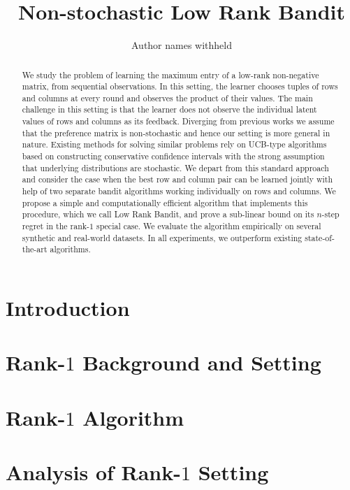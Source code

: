 \documentclass{article}
\title{Non-stochastic Low Rank Bandit}
\author{Author names withheld}
\begin{document}
\maketitle
\begin{abstract}
We study the problem of learning the maximum entry of a low-rank non-negative matrix, from sequential observations. In this setting, the learner chooses tuples of rows and columns at every round and observes the product of their values. The main challenge in this setting is that the learner does not observe the individual latent values of rows and columns as its feedback. Diverging from previous works we assume that the preference matrix is non-stochastic and hence our setting is more general in nature. Existing methods for solving similar problems rely on UCB-type algorithms based on constructing conservative confidence intervals with the strong assumption that underlying distributions are stochastic. We depart from this standard approach and consider the case when the best row and column pair can be learned jointly with help of two separate bandit algorithms working individually on rows and columns. We propose a simple and computationally efficient algorithm that implements this procedure, which we call Low Rank Bandit, and prove a sub-linear bound on its $n$-step regret in the rank-$1$ special case. We evaluate the algorithm empirically on several synthetic and real-world datasets. In all experiments, we outperform existing state-of-the-art algorithms.
\end{abstract}

\section{Introduction}
\label{sec:introduction}


\section{Rank-$1$ Background and Setting}
\label{sec:background}


\section{Rank-$1$ Algorithm}
\label{sec:rank1}


\vspace*{-0.5em}
\section{Analysis of Rank-$1$ Setting}
\label{sec:analysis}

\end{document}

